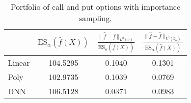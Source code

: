 \begin{table}[ht]
\centering
\begin{tabular}{lccc}
\toprule
 & $\mathrm{ES}_{\alpha}(\hat{f}(X))$ & $\frac{\|\hat f - \bar f\|_{L^2(\nu)}}{\mathrm{ES}_{\alpha}(\hat{f}(X))}$ & $\frac{\|\hat f - \bar f\|_{L^2(\hat \nu_\alpha)}}{\mathrm{ES}_{\alpha}(\hat{f}(X))}$ \\
\midrule
Linear & 104.5295 & 0.1040 & 0.1301 \\
Poly & 102.9735 & 0.1039 & 0.0769 \\
DNN & 106.5128 & 0.0371 & 0.0983 \\
\bottomrule
\end{tabular}
\caption{Portfolio of call and put options with importance sampling.}
\end{table}
